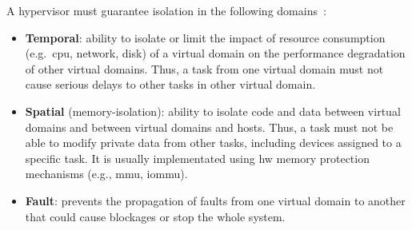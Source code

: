 A hypervisor must guarantee isolation in the following domains~\cite{cinque2022virtualizing}:
\begin{itemize}
\item \textbf{Temporal}:
  ability to isolate or limit the impact of resource consumption
  (e.g.~\gls{cpu}, network, disk) of a virtual domain on the performance degradation
  of other virtual domains. Thus, a task from one virtual domain must not cause serious
  delays to other tasks in other virtual domain. 
\item \textbf{Spatial} (memory-isolation): ability to isolate code and data
  between virtual domains and between virtual domains and hosts. Thus, a task
  must not be able to modify private data from other tasks, including devices
  assigned to a specific task. It is usually implementated using \gls{hw} memory
  protection mechanisms (e.g., \gls{mmu}, \gls{iommu}).
\item \textbf{Fault}: prevents the propagation of faults from one virtual domain
  to another that could cause blockages or stop the whole system.
\end{itemize}

